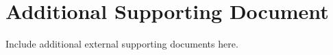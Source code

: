 \chapter{Additional Supporting Document}\label{ann:additional}
Include additional external supporting documents here.
